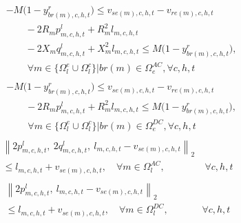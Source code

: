 \documentclass[a4paper,fleqn]{cas-dc}
\begin{document}
\begin{align}
    \label{v_drop_AC}
    \begin{aligned}
        & 
        - M \bigl( 1 - y_{br(m),c,h,t}^{r} \bigr) \leq
        v_{se(m),c,h,t} - v_{re(m),c,h,t} \\ 
        & \quad \quad - 
        2 R_{m} p_{m,c,h,t}^{l} + R_{m}^{2} l_{m,c,h,t} \\
        & \quad \quad - 
        2 X_{m} q_{m,c,h,t}^{l} + X_{m}^{2} l_{m,c,h,t} 
        \leq M \bigl( 1 - y_{br(m),c,h,t}^{r} \bigr), \\
        & \quad \quad \
        \forall m \in \{\Omega_{l}^{e} \cup \Omega_{l}^{c}\} 
        | br(m) \in \Omega_{e}^{AC},
        \forall c,h,t
    \end{aligned}
\end{align}
\begin{align}
    \label{v_drop_DC}
    \begin{aligned}
        & 
        - M \bigl( 1 - y_{br(m),c,h,t}^{r} \bigr) \leq
        v_{se(m),c,h,t} - v_{re(m),c,h,t} \\ 
        & \quad \quad - 
        2 R_{m} p_{m,c,h,t}^{l} +
        R_{m}^{2} l_{m,c,h,t} 
        \leq M \bigl( 1 - y_{br(m),c,h,t}^{r} \bigr), \\
        & \quad \quad \
        \forall m \in \{\Omega_{l}^{e} \cup \Omega_{l}^{c}\}
        | br(m) \in \Omega_{e}^{DC},
        \forall c,h,t
    \end{aligned}
\end{align}
\begin{align}
    \label{s_bfm_AC}
    \begin{aligned}
        \left\| 2 p_{m,c,h,t}^{l}, \ 2 q_{m,c,h,t}^{l}, 
        \ l_{m,c,h,t} - v_{se(m),c,h,t} \right\|_{2} & \\
        \leq 
        l_{m,c,h,t} + v_{se(m),c,h,t},
        \quad \forall m \in \Omega_{l}^{AC}, & \ \forall c,h,t
    \end{aligned}
\end{align}
\begin{align}
    \label{s_bfm_DC}
    \begin{aligned}
        \left\| 2 p_{m,c,h,t}^{l},
        \ l_{m,c,h,t} - v_{se(m),c,h,t} \right\|_{2} \qquad \quad \ \ \, & \\
        \leq 
        l_{m,c,h,t} + v_{se(m),c,h,t},
        \quad \forall m \in \Omega_{l}^{DC}, & \ \forall c,h,t
    \end{aligned}
\end{align}
\end{document}
